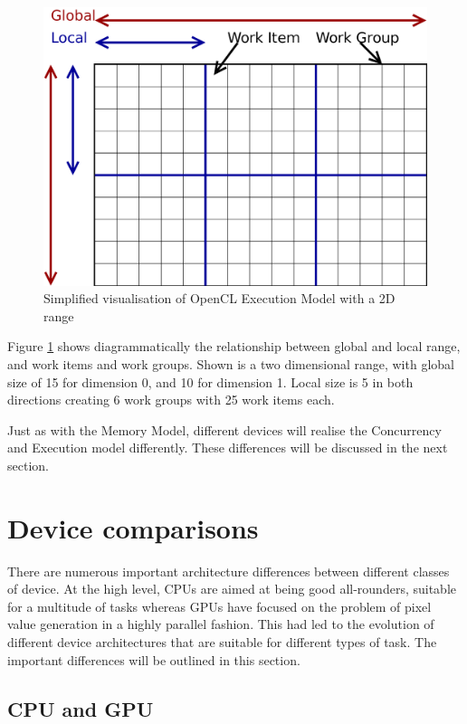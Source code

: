 \begin{figure}
\includegraphics[width=\linewidth]{images/openCLExecutionModel.png}
\caption{Simplified visualisation of OpenCL Execution Model with a 2D range}
\label{fig:openCLExecutionModel}
\end{figure}

Figure \ref{fig:openCLExecutionModel} shows diagrammatically the relationship
between global and local range, and work items and work groups. Shown is a two
dimensional range, with global size of 15 for dimension 0, and 10 for dimension
1. Local size is 5 in both directions creating 6 work groups with 25 work items
each.

Just as with the Memory Model, different devices will realise the Concurrency
and Execution model differently. These differences will be discussed in the next
section.

\section{Device comparisons}

There are numerous important architecture differences between different classes
of device. At the high level, CPUs are aimed at being good all-rounders,
suitable for a multitude of tasks whereas GPUs have focused on the problem of
pixel value generation in a highly parallel fashion. This had led to the
evolution of different device architectures that are suitable for different
types of task. The important differences will be outlined in this section.

\subsection{CPU and GPU}

